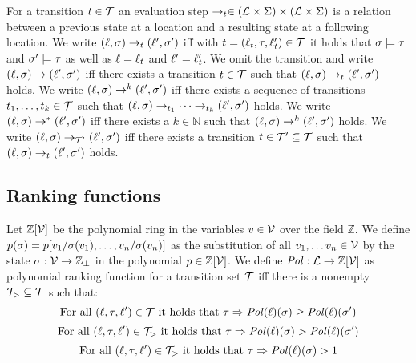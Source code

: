 \begin{definition}[Evaluation] 
  For a transition $t \in \mathcal{T}$ an evaluation step $\rightarrow_t \in (\mathcal{L} \times \Sigma) \times (\mathcal{L} \times \Sigma)$ is a relation between a previous state at a location and a resulting state at a following location.
  We write $(\ell, \sigma) \rightarrow_t (\ell', \sigma')$ iff with $t = (\ell_t, \tau, \ell_t') \in \mathcal{T}$ it holds that $\sigma \models \tau$ and $\sigma' \models \tau$ as well as $\ell = \ell_t$ and $\ell' = \ell_t'$.
  We omit the transition and write $(\ell, \sigma) \rightarrow (\ell', \sigma')$ iff there exists a transition $t \in \mathcal{T}$ such that $(\ell, \sigma) \rightarrow_t (\ell', \sigma')$ holds.
  We write $(\ell, \sigma) \rightarrow^k (\ell', \sigma')$ iff there exists a sequence of transitions $t_1, \dots, t_k \in \mathcal{T}$ such that $(\ell, \sigma) \rightarrow_{t_1} \dots \rightarrow_{t_k} (\ell', \sigma')$ holds.
  We write $(\ell, \sigma) \rightarrow^* (\ell', \sigma')$ iff there exists a $k \in \mathbb{N}$ such that $(\ell, \sigma) \rightarrow^k (\ell', \sigma')$ holds.
  We write $(\ell, \sigma) \rightarrow_{\mathcal{T}'} (\ell', \sigma')$ iff there exists a transition $t \in \mathcal{T}' \subseteq \mathcal{T}$ such that $(\ell, \sigma) \rightarrow_t (\ell', \sigma')$ holds.
\end{definition}


\subsection{Ranking functions}

\begin{definition} 
	Let $\mathbb{Z}[\mathcal{V}]$ be the polynomial ring in the variables $v \in \mathcal{V}$ over the field $\mathbb{Z}$.
	We define $p(\sigma) = p[v_1/\sigma(v_1), \dots, v_n/\sigma(v_n)]$ as the substitution of all $v_1, \dots v_n \in \mathcal{V}$ by the state $\sigma: \mathcal{V} \rightarrow \mathbb{Z}_\bot$ in the polynomial $p \in \mathbb{Z}[\mathcal{V}]$.
	We define $\mathit{Pol}: \mathcal{L} \rightarrow \mathbb{Z}[\mathcal{V}]$ as polynomial ranking function for a transition set $\mathcal{T}$ iff there is a nonempty $\mathcal{T}_{>} \subseteq \mathcal{T}$ such that:
	\[ \text{For all } (\ell, \tau, \ell') \in \mathcal{T} \text{ it holds that } \tau \Rightarrow \mathit{Pol}(\ell)(\sigma) \geq \mathit{Pol}(\ell)(\sigma') \]
	\[ \text{For all } (\ell, \tau, \ell') \in \mathcal{T}_{>} \text{ it holds that } \tau \Rightarrow \mathit{Pol}(\ell)(\sigma) > \mathit{Pol}(\ell)(\sigma') \]
	\[ \text{For all } (\ell, \tau, \ell') \in \mathcal{T}_{>} \text{ it holds that } \tau \Rightarrow \mathit{Pol}(\ell)(\sigma) > 1 \]
\end{definition}


